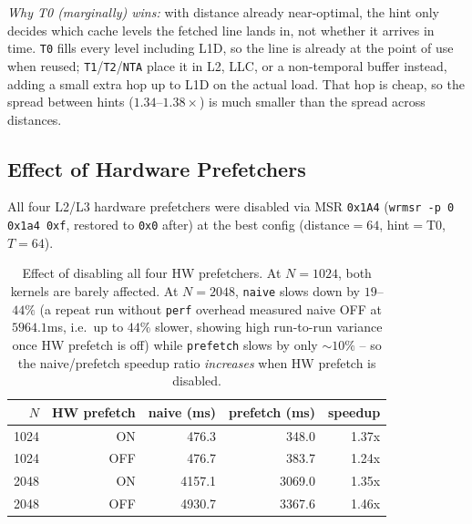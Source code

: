 \documentclass[11pt]{article}
\begin{document}
\textit{Why T0 (marginally) wins:} with distance already near-optimal, the
hint only decides which cache levels the fetched line lands in, not whether it
arrives in time. \texttt{T0} fills every level including L1D, so the line is
already at the point of use when reused; \texttt{T1}/\texttt{T2}/\texttt{NTA}
place it in L2, LLC, or a non-temporal buffer instead, adding a small extra
hop up to L1D on the actual load. That hop is cheap, so the spread between
hints ($1.34$--$1.38\times$) is much smaller than the spread across distances.

\subsection{Effect of Hardware Prefetchers}

All four L2/L3 hardware prefetchers were disabled via MSR \texttt{0x1A4}
(\texttt{wrmsr -p 0 0x1a4 0xf}, restored to \texttt{0x0} after) at the best
config (distance$=64$, hint$=$T0, $T=64$).

\begin{table}[H]
    \centering
    \begin{tabular}{rrrrr}
        \toprule
        \textbf{$N$} & \textbf{HW prefetch} & \textbf{naive (ms)} & \textbf{prefetch (ms)} & \textbf{speedup} \\
        \midrule
        1024 & ON  & 476.3  & 348.0  & 1.37x \\
        1024 & OFF & 476.7  & 383.7  & 1.24x \\
        2048 & ON  & 4157.1 & 3069.0 & 1.35x \\
        2048 & OFF & 4930.7 & 3367.6 & 1.46x \\
        \bottomrule
    \end{tabular}
    \caption{Effect of disabling all four HW prefetchers. At $N=1024$, both
    kernels are barely affected. At $N=2048$, \texttt{naive} slows down by
    $19$--$44\%$ (a repeat run without \texttt{perf} overhead measured naive
    OFF at $5964.1$ms, i.e.\ up to $44\%$ slower, showing high run-to-run
    variance once HW prefetch is off) while \texttt{prefetch} slows by only
    $\sim\!10\%$ -- so the naive/prefetch speedup ratio \emph{increases} when
    HW prefetch is disabled.}
    \label{tab:t2-hwpf}
\end{table}
\end{document}
